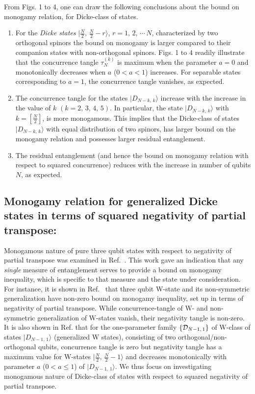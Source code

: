 \documentclass[pra,a4paper,showpacs,superscriptaddress]{revtex4}
\begin{document}
From Figs. 1 to 4, one can draw the following conclusions about the bound on monogamy relation, for Dicke-class of states. 
\begin{enumerate}
\item For the {\emph{Dicke states}} $\vert \frac{N}{2},\, \frac{N}{2}-r\rangle$, $r=1,\,2,\,\cdots \,N$, characterized by two orthogonal spinors the bound on monogamy is larger compared to their companion states with non-orthogonal spinors. Figs. 1 to 4 readily illustrate that the concurrence tangle $\tau_N^{(k)}$ is maximum when the parameter
$a=0$ and monotonically decreases when $a$ ($0<a<1$) increases. For  separable states corresponding to $a=1$, the concurrence tangle vanishes, as expected. 

\item The concurrence tangle for the states $\vert D_{N-k,\,k}\rangle$ increase with the increase in the value of $k$ $(k=2,\,3,\,4,\,5)$. 
In particular, the state $\vert D_{N-k,\, k}\rangle$ with $k=\left[\frac{N}{2}\right]$,
is more monogamous. This implies that the Dicke-class of states $\vert D_{N-k,\,k}\rangle$ with equal distribution of two spinors, has larger bound on the monogamy relation and possesses larger residual entanglement. 

\item 
The residual entanglement (and hence the bound on monogamy relation with respect to squared concurrence) reduces with the increase in number of qubits $N$,  as expected.  

\end{enumerate} 

\subsection{Monogamy relation for generalized Dicke states in terms of squared negativity of partial transpose:} 

Monogamous nature of pure three qubit states with respect to negativity of partial transpose was examined in Ref.~\cite{neg}. This work gave an indication that any {\emph{single}} measure of entanglement serves to provide a bound on monogamy inequality, which is specific to that measure and the state under consideration.
For instance, it is shown in  Ref.~\cite{neg} that three qubit W-state and its non-symmetric generalization have non-zero bound on monogamy inequality, set up in terms of negativity of partial transpose. While concurrence-tangle of W- and non-symmetric generalization of W-states vanish, their negativity tangle is non-zero. It is also shown in Ref. \cite{pjg2} that for the  one-parameter family 
$\{{\cal D}_{N-1,\,1}\}$ of W-class of states $\vert D_{N-1,\,1}\rangle$ (generalized W states), consisting of two orthogonal/non-orthogonal qubits, concurrence tangle is zero but  negativity tangle has a maximum value for W-states $\vert \frac{N}{2},\,{\frac{N}{2}}-1\rangle$ and decreases monotonically with parameter 
$a$ ($0<a\leq 1$) of $\vert D_{N-1,\,1}\rangle$. 
We thus focus on investigating monogamous nature of Dicke-class of states with respect to squared negativity of partial transpose. 
\end{document}
